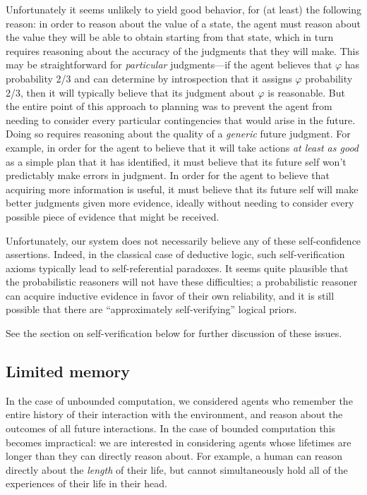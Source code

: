 \documentclass[12pt]{article}
\theoremstyle{definition}
\newcommand{\vp}{\varphi}
\begin{document}
Unfortunately it seems unlikely
to yield good behavior, for (at least) the following reason:
in order to reason about the value of a state, the agent
must reason about the value they will be able to obtain starting from that state,
which in turn requires reasoning about the accuracy of the judgments that they
will make.
This may be straightforward for \emph{particular} judgments---if the agent
believes that $\vp$ has probability 2/3 and can determine by introspection
that it assigns $\vp$ probability 2/3, then it will typically believe that its judgment
about $\vp$ is reasonable.
But the entire point of this approach to planning was to prevent the agent
from needing to consider every particular contingencies that would
arise in the future.
Doing so requires reasoning about the quality of a \emph{generic} future judgment.
For example, in order for the agent to believe that it will take actions
\emph{at least as good} as a simple plan that it has identified,
it must believe that its future self won't predictably make errors in judgment.
In order for the agent to believe that acquiring more information is useful,
it must believe that its future self will make better judgments given more evidence,
ideally without needing to consider every possible piece of evidence
that might be received.

Unfortunately, our system does not necessarily believe any of these
self-confidence assertions.
Indeed, in the classical case of deductive logic, such self-verification
axioms typically lead to self-referential paradoxes.
It seems quite plausible that the probabilistic reasoners will not have these
difficulties; a probabilistic reasoner can acquire inductive
evidence in favor of their own reliability, and it is still possible
that there are ``approximately self-verifying'' logical priors.

See the section on self-verification below for further discussion of these issues.

\subsection{Limited memory}

In the case of unbounded computation, we considered agents
who remember the entire history of their interaction with the environment,
and reason about the outcomes of all future interactions.
In the case of bounded computation this becomes impractical: we are interested in considering
agents whose lifetimes are longer than they can directly reason about.
For example, a human can reason directly about the \emph{length} of their life,
but cannot simultaneously hold all of the experiences of their life in their head.
\end{document}
